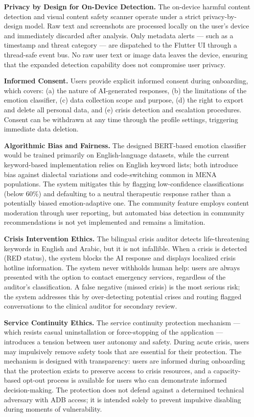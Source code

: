 \documentclass[
  letterpaper,
  12pt,
  a4paper,
  openany]{report}
\begin{document}
\textbf{Privacy by Design for On-Device Detection.} The on-device
harmful content detection and visual content safety scanner operate
under a strict privacy-by-design model. Raw text and screenshots are
processed locally on the user's device and immediately discarded after
analysis. Only metadata alerts --- such as a timestamp and threat
category --- are dispatched to the Flutter UI through a thread-safe
event bus. No raw user text or image data leaves the device, ensuring
that the expanded detection capability does not compromise user privacy.

\textbf{Informed Consent.} Users provide explicit informed consent
during onboarding, which covers: (a) the nature of AI-generated
responses, (b) the limitations of the emotion classifier, (c) data
collection scope and purpose, (d) the right to export and delete all
personal data, and (e) crisis detection and escalation procedures.
Consent can be withdrawn at any time through the profile settings,
triggering immediate data deletion.

\textbf{Algorithmic Bias and Fairness.} The designed BERT-based emotion
classifier would be trained primarily on English-language datasets,
while the current keyword-based implementation relies on English keyword
lists; both introduce bias against dialectal variations and
code-switching common in MENA populations. The system mitigates this by
flagging low-confidence classifications (below 60\%) and defaulting to a
neutral therapeutic response rather than a potentially biased
emotion-adaptive one. The community feature employs content moderation
through user reporting, but automated bias detection in community
recommendations is not yet implemented and remains a limitation.

\textbf{Crisis Intervention Ethics.} The bilingual crisis auditor
detects life-threatening keywords in English and Arabic, but it is not
infallible. When a crisis is detected (RED status), the system blocks
the AI response and displays localized crisis hotline information. The
system never withholds human help: users are always presented with the
option to contact emergency services, regardless of the auditor's
classification. A false negative (missed crisis) is the most serious
risk; the system addresses this by over-detecting potential crises and
routing flagged conversations to the clinical auditor for secondary
review.

\textbf{Service Continuity Ethics.} The service continuity protection
mechanism --- which resists casual uninstallation or force-stopping of
the application --- introduces a tension between user autonomy and
safety. During acute crisis, users may impulsively remove safety tools
that are essential for their protection. The mechanism is designed with
transparency: users are informed during onboarding that the protection
exists to preserve access to crisis resources, and a capacity-based
opt-out process is available for users who can demonstrate informed
decision-making. The protection does not defend against a determined
technical adversary with ADB access; it is intended solely to prevent
impulsive disabling during moments of vulnerability.
\end{document}
